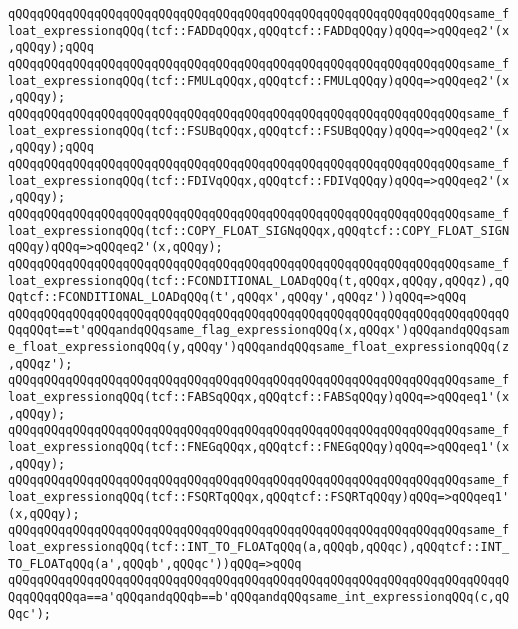 \verb|qQQqqQQqqQQqqQQqqQQqqQQqqQQqqQQqqQQqqQQqqQQqqQQqqQQqqQQqqQQqqQQqsame_float_expressionqQQq(tcf::FADDqQQqx,qQQqtcf::FADDqQQqy)qQQq=>qQQqeq2'(x,qQQqy);qQQq|\newline
\verb|qQQqqQQqqQQqqQQqqQQqqQQqqQQqqQQqqQQqqQQqqQQqqQQqqQQqqQQqqQQqqQQqsame_float_expressionqQQq(tcf::FMULqQQqx,qQQqtcf::FMULqQQqy)qQQq=>qQQqeq2'(x,qQQqy);|\newline
\verb|qQQqqQQqqQQqqQQqqQQqqQQqqQQqqQQqqQQqqQQqqQQqqQQqqQQqqQQqqQQqqQQqsame_float_expressionqQQq(tcf::FSUBqQQqx,qQQqtcf::FSUBqQQqy)qQQq=>qQQqeq2'(x,qQQqy);qQQq|\newline
\verb|qQQqqQQqqQQqqQQqqQQqqQQqqQQqqQQqqQQqqQQqqQQqqQQqqQQqqQQqqQQqqQQqsame_float_expressionqQQq(tcf::FDIVqQQqx,qQQqtcf::FDIVqQQqy)qQQq=>qQQqeq2'(x,qQQqy);|\newline
\verb|qQQqqQQqqQQqqQQqqQQqqQQqqQQqqQQqqQQqqQQqqQQqqQQqqQQqqQQqqQQqqQQqsame_float_expressionqQQq(tcf::COPY_FLOAT_SIGNqQQqx,qQQqtcf::COPY_FLOAT_SIGNqQQqy)qQQq=>qQQqeq2'(x,qQQqy);|\newline
\verb|qQQqqQQqqQQqqQQqqQQqqQQqqQQqqQQqqQQqqQQqqQQqqQQqqQQqqQQqqQQqqQQqsame_float_expressionqQQq(tcf::FCONDITIONAL_LOADqQQq(t,qQQqx,qQQqy,qQQqz),qQQqtcf::FCONDITIONAL_LOADqQQq(t',qQQqx',qQQqy',qQQqz'))qQQq=>qQQq|\newline
\verb|qQQqqQQqqQQqqQQqqQQqqQQqqQQqqQQqqQQqqQQqqQQqqQQqqQQqqQQqqQQqqQQqqQQqqQQqqQQqt==t'qQQqandqQQqsame_flag_expressionqQQq(x,qQQqx')qQQqandqQQqsame_float_expressionqQQq(y,qQQqy')qQQqandqQQqsame_float_expressionqQQq(z,qQQqz');|\newline
\verb|qQQqqQQqqQQqqQQqqQQqqQQqqQQqqQQqqQQqqQQqqQQqqQQqqQQqqQQqqQQqqQQqsame_float_expressionqQQq(tcf::FABSqQQqx,qQQqtcf::FABSqQQqy)qQQq=>qQQqeq1'(x,qQQqy);|\newline
\verb|qQQqqQQqqQQqqQQqqQQqqQQqqQQqqQQqqQQqqQQqqQQqqQQqqQQqqQQqqQQqqQQqsame_float_expressionqQQq(tcf::FNEGqQQqx,qQQqtcf::FNEGqQQqy)qQQq=>qQQqeq1'(x,qQQqy);|\newline
\verb|qQQqqQQqqQQqqQQqqQQqqQQqqQQqqQQqqQQqqQQqqQQqqQQqqQQqqQQqqQQqqQQqsame_float_expressionqQQq(tcf::FSQRTqQQqx,qQQqtcf::FSQRTqQQqy)qQQq=>qQQqeq1'(x,qQQqy);|\newline
\verb|qQQqqQQqqQQqqQQqqQQqqQQqqQQqqQQqqQQqqQQqqQQqqQQqqQQqqQQqqQQqqQQqsame_float_expressionqQQq(tcf::INT_TO_FLOATqQQq(a,qQQqb,qQQqc),qQQqtcf::INT_TO_FLOATqQQq(a',qQQqb',qQQqc'))qQQq=>qQQq|\newline
\verb|qQQqqQQqqQQqqQQqqQQqqQQqqQQqqQQqqQQqqQQqqQQqqQQqqQQqqQQqqQQqqQQqqQQqqQQqqQQqqQQqa==a'qQQqandqQQqb==b'qQQqandqQQqsame_int_expressionqQQq(c,qQQqc');|\newline
